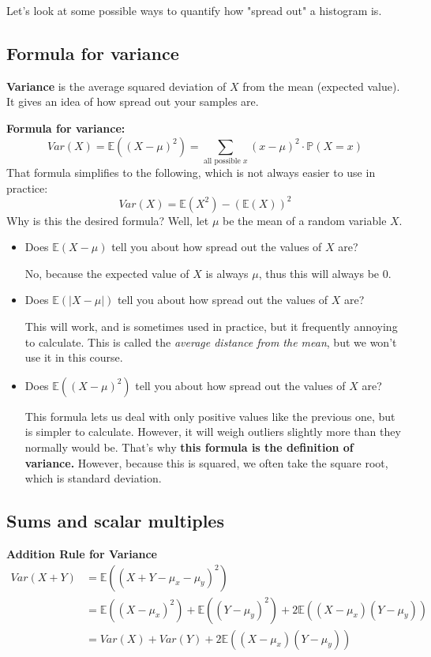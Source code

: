 \documentclass[titlepage, 12pt, leqno]{article}
\begin{document}
Let's look at some possible ways to quantify how "spread out" a histogram is.

\subsection{Formula for variance}
\begin{definition}
    \textbf{Variance} is the average squared deviation of $X$ from the mean 
    (expected value). It gives an idea of how spread out your samples are.
\end{definition}

\textbf{Formula for variance:}
\[
Var(X) = \mathbb{E}((X-\mu)^2) = \sum_{ \text{all possible }x}
(x-\mu)^2 \cdot \mathbb{P}(X=x)
\]
That formula simplifies to the following, which is not always easier to use in
practice:
\[
Var(X) = \mathbb{E}(X^2) - ( \mathbb{E}(X))^2
\]
Why is this the desired formula? Well, let $\mu$ be the mean of a random
variable $X$.
\begin{itemize}
    \item Does $ \mathbb{E}(X-\mu)$ tell you about how spread out the values
        of $X$ are?

        No, because the expected value of $X$ is always $\mu$, thus this will
        always be 0.
    \item Does $ \mathbb{E}(|X-\mu|)$ tell you about how spread out the values 
        of $X$ are?

        This will work, and is sometimes used in practice, but it frequently 
        annoying to calculate. This is called the \textit{average distance from
        the mean}, but we won't use it in this course.
    \item Does $ \mathbb{E}((X-\mu)^2)$ tell you about how spread out the values 
        of $X$ are?

        This formula lets us deal with only positive values like the previous one,
        but is simpler to calculate. However, it will weigh outliers slightly 
        more than they normally would be. That's why \textbf{this formula is the
        definition of variance.} However, because this is squared, we often take
        the square root, which is standard deviation.
\end{itemize}

\subsection{Sums and scalar multiples}
\textbf{Addition Rule for Variance}
\begin{align*}
    Var(X+Y) &= \mathbb{E}((X+Y-\mu_x-\mu_y)^2) \\
             &= \mathbb{E}((X-\mu_x)^2) + \mathbb{E}((Y-\mu_y)^2) +
             2 \mathbb{E}((X-\mu_x)(Y-\mu_y)) \\
             &= Var(X) + Var(Y) + 2 \mathbb{E}((X-\mu_x)(Y-\mu_y)) 
\end{align*}
\end{document}
